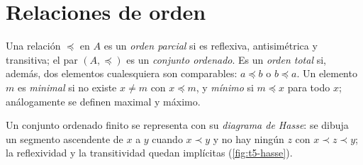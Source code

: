 \section{Relaciones de orden}

\begin{definicion}[Orden]
Una relación $\preceq$ en $A$ es un \emph{orden parcial} si es reflexiva, antisimétrica y transitiva; el par $(A,\preceq)$ es un \emph{conjunto ordenado}. Es un \emph{orden total} si, además, dos elementos cualesquiera son comparables: $a\preceq b$ o $b\preceq a$. Un elemento $m$ es \emph{minimal} si no existe $x\neq m$ con $x\preceq m$, y \emph{mínimo} si $m\preceq x$ para todo $x$; análogamente se definen maximal y máximo.
\end{definicion}

\addtocounter{definicion}{1}%

Un conjunto ordenado finito se representa con su \emph{diagrama de Hasse}: se dibuja un segmento ascendente de $x$ a $y$ cuando $x\prec y$ y no hay ningún $z$ con $x\prec z\prec y$; la reflexividad y la transitividad quedan implícitas (\cref{fig:t5-hasse}).

\addtocounter{figure}{1}%

\addtocounter{definicion}{1}%

\addtocounter{definicion}{1}%

